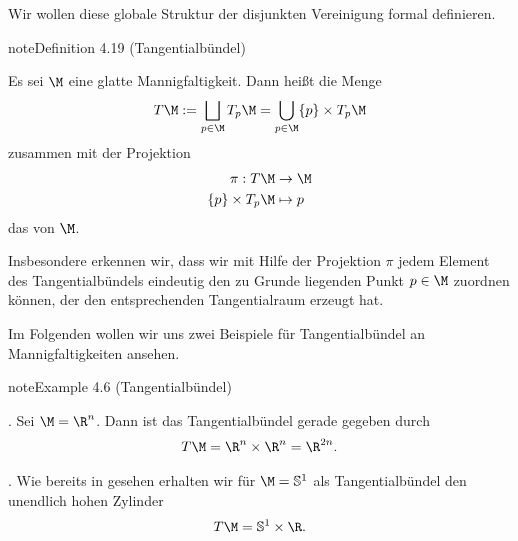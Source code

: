 \documentclass[letterpaper,10pt,english]{jupyterBook}
\begin{document}
\sphinxAtStartPar
Wir wollen diese globale Struktur der disjunkten Vereinigung formal definieren.
\label{manifolds/tangential:definition-20}
\begin{sphinxadmonition}{note}{Definition 4.19 (Tangentialbündel)}



\sphinxAtStartPar
Es sei \(\M\) eine glatte Mannigfaltigkeit.
Dann heißt die Menge
\begin{equation*}
\begin{split}T\M := \bigsqcup_{p\in\M}  T_p\M = \bigcup_{p\in\M} \{p\} \times T_p\M\end{split}
\end{equation*}
\sphinxAtStartPar
zusammen mit der Projektion
\begin{equation*}
\begin{split}\pi:T\M &\to \M\\
\{p\}\times T_p\M &\mapsto p\end{split}
\end{equation*}
\sphinxAtStartPar
das  von \(\M\).
\end{sphinxadmonition}

\sphinxAtStartPar
Insbesondere erkennen wir, dass wir mit Hilfe der Projektion \(\pi\) jedem Element des Tangentialbündels eindeutig den zu Grunde liegenden Punkt \(p\in\M\) zuordnen können, der den entsprechenden Tangentialraum erzeugt hat.

\sphinxAtStartPar
Im Folgenden wollen wir uns zwei Beispiele für Tangentialbündel an Mannigfaltigkeiten ansehen.
\label{manifolds/tangential:example-21}
\begin{sphinxadmonition}{note}{Example 4.6 (Tangentialbündel)}





. Sei \(\M=\R^n\).
Dann ist das Tangentialbündel gerade gegeben durch
\begin{equation*}
\begin{split}T\M = \R^n\times\R^n = \R^{2n}.\end{split}
\end{equation*}


. Wie bereits in {\hyperref[\detokenize{manifolds/tangential:ex:tangentialS1}]{}} gesehen erhalten wir für \(\M=\mathbb{S}^1\) als Tangentialbündel den unendlich hohen Zylinder
\begin{equation*}
\begin{split}T\M = \mathbb{S}^1\times \R.\end{split}
\end{equation*}\end{sphinxadmonition}
\end{document}
